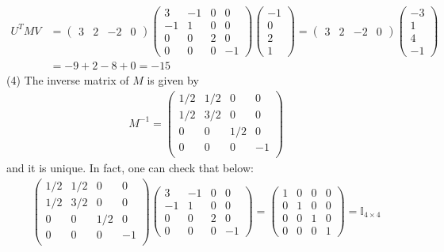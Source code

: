 \documentclass[12pt]{article}
\begin{document}
\begin{align*}
U^T M V &= 
\begin{pmatrix}
3& 2 & -2 & 0
\end{pmatrix}
\begin{pmatrix}
3 & -1 & 0 & 0 \\
-1 & 1 & 0 & 0 \\
0 & 0 & 2 & 0 \\
0 & 0 & 0 & -1
\end{pmatrix}
\begin{pmatrix}
-1\\ 0 \\ 2 \\ 1
\end{pmatrix}
=
\begin{pmatrix}
3& 2 & -2 & 0
\end{pmatrix}
\begin{pmatrix}
-3 \\ 1 \\ 4 \\-1
\end{pmatrix}\\[1em]
&= - 9 + 2 - 8 + 0 = - 15
\end{align*}
(4)
The inverse matrix of $M$ is given by
\begin{align*}
M^{-1} = 
\begin{pmatrix}
1/2 & 1/2 & 0 & 0 \\
1/2 & 3/2 & 0 & 0 \\
0 & 0 & 1/2 & 0 \\
0 & 0 & 0 & -1 \\
\end{pmatrix}
\end{align*}
and it is unique. In fact, one can check that below:
\begin{align*}
\begin{pmatrix}
1/2 & 1/2 & 0 & 0 \\
1/2 & 3/2 & 0 & 0 \\
0 & 0 & 1/2 & 0 \\
0 & 0 & 0 & -1 \\
\end{pmatrix}
\begin{pmatrix}
3 & -1 & 0 & 0 \\
-1 & 1 & 0 & 0 \\
0 & 0 & 2 & 0 \\
0 & 0 & 0 & -1
\end{pmatrix}
=
\begin{pmatrix}
1 & 0 & 0 & 0 \\
0 & 1 & 0 & 0 \\
0 & 0 & 1 & 0 \\
0 & 0 & 0 & 1
\end{pmatrix}
= \mathbb{I}_{4\times4}
\end{align*}
\end{document}
